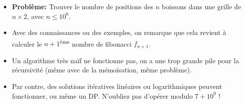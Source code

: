 \begin{frame}
    \frametitle{\problemtitle}
    \begin{itemize}
        \item<+-> \textbf{Problème:} Trouver le nombre de positions des $n$ boissons dans une grille de $n\times 2$, avec $n \le 10^{6}$.
        \item<+-> Avec des connaissances ou des exemples, on remarque que cela revient à calculer le $n+1$\textsuperscript{ème} nombre de fibonacci $f_{n+1}$.
        \item<+-> Un algorithme très na\"if ne fonctionne pas, on a une trop grande pile pour la récursivité (même avec de la mémo\"isation, même problème).
        \item<+-> Par contre, des solutions itératives linéaires ou logarithmiques peuvent fonctionner, ou même un DP. N'oubliez pas d'opérer modulo $7+10^9$ !
    \end{itemize}
\end{frame}
